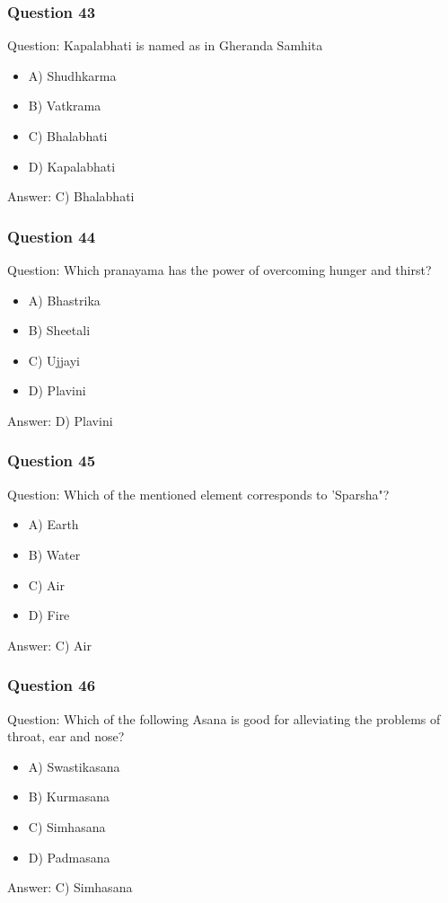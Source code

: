 \begin{frame}[fragile]\frametitle{Question 43}
Question: Kapalabhati is named as in Gheranda Samhita
\begin{itemize}
\item A) Shudhkarma
\item B) Vatkrama
\item C) Bhalabhati
\item D) Kapalabhati
\end{itemize}
Answer: C) Bhalabhati
\end{frame}

\begin{frame}[fragile]\frametitle{Question 44}
Question: Which pranayama has the power of overcoming hunger and thirst?
\begin{itemize}
\item A) Bhastrika
\item B) Sheetali
\item C) Ujjayi
\item D) Plavini
\end{itemize}
Answer: D) Plavini
\end{frame}

\begin{frame}[fragile]\frametitle{Question 45}
Question: Which of the mentioned element corresponds to 'Sparsha"?
\begin{itemize}
\item A) Earth
\item B) Water
\item C) Air
\item D) Fire
\end{itemize}
Answer: C) Air
\end{frame}

\begin{frame}[fragile]\frametitle{Question 46}
Question: Which of the following Asana is good for alleviating the problems of throat, ear and nose?
\begin{itemize}
\item A) Swastikasana
\item B) Kurmasana
\item C) Simhasana
\item D) Padmasana
\end{itemize}
Answer: C) Simhasana
\end{frame}

